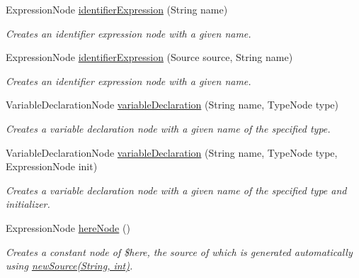 \begin{DoxyCompactItemize}
Expression\+Node \hyperlink{classedu_1_1udel_1_1cis_1_1vsl_1_1civl_1_1transform_1_1common_1_1BaseWorker_a5e675e2c66849b7d35a0fceec59d8372}{identifier\+Expression} (String name)
\begin{DoxyCompactList}\small\item\em Creates an identifier expression node with a given name. \end{DoxyCompactList}\item 
Expression\+Node \hyperlink{classedu_1_1udel_1_1cis_1_1vsl_1_1civl_1_1transform_1_1common_1_1BaseWorker_adef13efd163ca0330c6f2bdf132d6507}{identifier\+Expression} (Source source, String name)
\begin{DoxyCompactList}\small\item\em Creates an identifier expression node with a given name. \end{DoxyCompactList}\item 
Variable\+Declaration\+Node \hyperlink{classedu_1_1udel_1_1cis_1_1vsl_1_1civl_1_1transform_1_1common_1_1BaseWorker_a0f6440953394086890ac1fade5468481}{variable\+Declaration} (String name, Type\+Node type)
\begin{DoxyCompactList}\small\item\em Creates a variable declaration node with a given name of the specified type. \end{DoxyCompactList}\item 
Variable\+Declaration\+Node \hyperlink{classedu_1_1udel_1_1cis_1_1vsl_1_1civl_1_1transform_1_1common_1_1BaseWorker_aba54c222dbe905b31699920e5e057b74}{variable\+Declaration} (String name, Type\+Node type, Expression\+Node init)
\begin{DoxyCompactList}\small\item\em Creates a variable declaration node with a given name of the specified type and initializer. \end{DoxyCompactList}\item 
Expression\+Node \hyperlink{classedu_1_1udel_1_1cis_1_1vsl_1_1civl_1_1transform_1_1common_1_1BaseWorker_a0fd4589ffcbfa9db8159db75bb2a047d}{here\+Node} ()
\begin{DoxyCompactList}\small\item\em Creates a constant node of {\ttfamily \$here}, the source of which is generated automatically using \hyperlink{classedu_1_1udel_1_1cis_1_1vsl_1_1civl_1_1transform_1_1common_1_1BaseWorker_a45d64b7e09a96de3fe161198a0ad8f5a}{new\+Source(\+String, int)}. \end{DoxyCompactList}\item 

\end{DoxyCompactItemize}

